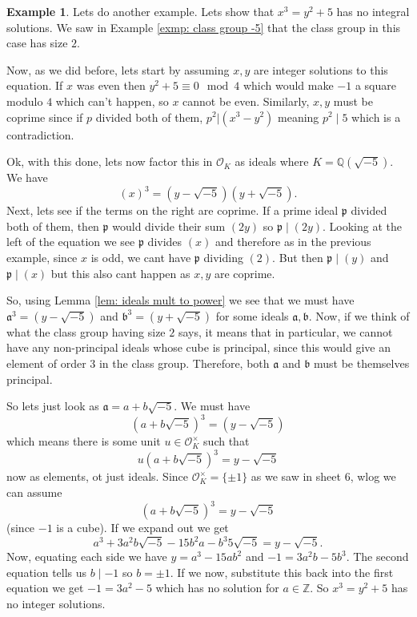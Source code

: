 \documentclass[11pt,a4paper]{report}
\theoremstyle{plain}
\theoremstyle{definition}
\newtheorem{exmp}[subsection]{Example}
\theoremstyle{definition}
\newcommand{\ZZ}{\mathbb{Z}}
\def\QQ{\mathbb{Q}}
\def\gothb{\mathfrak{b}}
\def\gothp{\mathfrak{p}}
\def \OO {\mathcal{O}}
\def\gotha{\mathfrak{a}}
\begin{document}
\begin{exmp}
	Lets do another example. Lets show that $x^3=y^2+5$ has  no integral solutions. We saw in Example \ref{exmp: class group -5} that the class group in this case has size $2$.
	
	
	Now, as we did before, lets start by assuming $x,y$ are integer solutions to this equation. If $x$ was even then $y^2+5 \equiv 0 \mod 4$ which would make $-1$ a square modulo $4$ which can't happen, so $x$ cannot be even. Similarly, $x,y$ must be coprime since if $p$ divided both of them, $p^2| (x^3-y^2)$ meaning $p^2 \mid 5$ which is a contradiction.
	
	Ok, with this done, lets now factor this in $\OO_K$ as ideals where $K=\QQ(\sqrt{-5})$. We have \[(x)^3=(y-\sqrt{-5})(y+\sqrt{-5}).\] Next, lets see if the terms on the right are coprime. If a prime ideal $\gothp$ divided both of them, then $\gothp$ would divide their sum $(2y)$ so $\gothp \mid (2y)$. Looking at the left of the equation we see $\gothp$ divides $(x)$ and therefore as in the previous example, since $x$ is odd, we cant have $\gothp$ dividing $(2)$. But then $\gothp \mid (y)$ and $\gothp\mid (x)$ but this also cant happen as $x,y$ are coprime.
	
	So, using Lemma \ref{lem: ideals mult to power} we see that we must have $\gotha^3=(y-\sqrt{-5})$ and $\gothb^3=(y+\sqrt{-5})$ for some ideals $\gotha,\gothb$. Now, if we think of what the class group having size $2$ says, it means that in particular, we cannot have any non-principal ideals whose cube is principal, since this would give an element of order $3$ in the class group. Therefore, both $\gotha$ and $\gothb$ must be themselves principal.
	
	So lets just look as $\gotha=a+b\sqrt{-5}$. We must have \[(a+b\sqrt{-5})^3=(y-\sqrt{-5})\] which means there is some unit $u \in \OO_K^\times$ such that \[u(a+b\sqrt{-5})^3=y-\sqrt{-5}\] now as elements, ot just ideals. Since $\OO_K^\times=\{\pm 1\}$ as we saw in sheet 6, wlog we can assume \[(a+b\sqrt{-5})^3=y-\sqrt{-5}\] (since $-1$ is a cube). If we expand out we get \[a^3+3a^2b\sqrt{-5}-15b^2a-b^3 5 \sqrt{-5}=y-\sqrt{-5}.\] Now, equating each side we have $y=a^3-15ab^2$ and $-1=3a^2b-5b^3$. The second equation tells us $b \mid -1$ so $b=\pm 1$. If we now, substitute this back into the first equation we get $-1=3a^2-5$ which has no solution for $a \in \ZZ$. So $x^3=y^2+5$ has no integer solutions.
	
	
	
	
	
\end{exmp}
\end{document}
